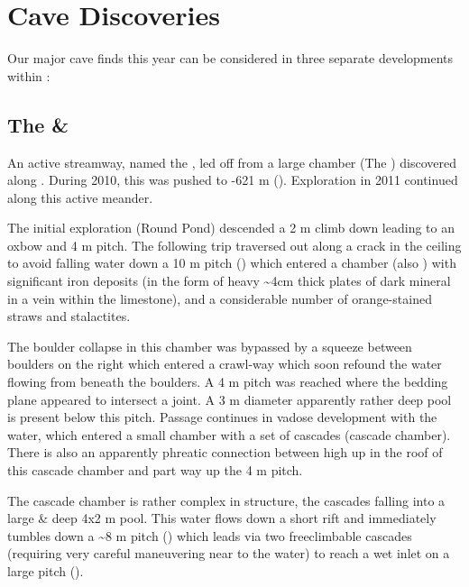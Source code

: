 
\section{Cave Discoveries}

Our major cave finds this year can be considered in three separate
developments within :


\subsection{\texorpdfstring{The  \& }{The Serpentine \& Let na Drugi Svet}}

An active streamway, named the , led off from a large
chamber (The ) discovered along . During 2010, this was pushed to -621 m (). Exploration in 2011 continued along this active
meander.

The initial exploration (Round Pond) descended a 2 m climb down leading
to an oxbow and 4 m pitch. The following trip traversed out along a
crack in the ceiling to avoid falling water down a 10 m pitch
() which entered a chamber (also ) with
significant iron deposits (in the form of heavy \textasciitilde 4cm
thick plates of dark mineral in a vein within the limestone), and a
considerable number of orange-stained straws and stalactites.

The boulder collapse in this chamber was bypassed by a squeeze between
boulders on the right which entered a crawl-way which soon refound the
water flowing from beneath the boulders. A 4 m pitch was reached where
the bedding plane appeared to intersect a joint. A 3 m diameter
apparently rather deep pool is present below this pitch. Passage
continues in vadose development with the water, which entered a small
chamber with a set of cascades (cascade chamber). There is also an
apparently phreatic connection between high up in the roof of this
cascade chamber and part way up the 4 m pitch.

The cascade chamber is rather complex in structure, the cascades falling
into a large \& deep 4x2 m pool. This water flows down a short rift and
immediately tumbles down a \textasciitilde 8 m pitch ()
which leads via two freeclimbable cascades (requiring very careful
maneuvering near to the water) to reach a wet inlet on a large pitch
().


